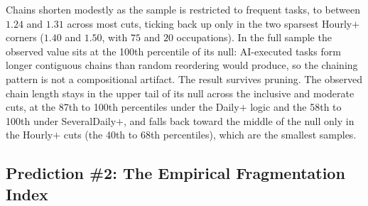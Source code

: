 Chains shorten modestly as the sample is restricted to frequent tasks, to between $1.24$ and $1.31$ across most cuts, ticking back up only in the two sparsest Hourly$+$ corners ($1.40$ and $1.50$, with $75$ and $20$ occupations).
In the full sample the observed value sits at the 100th percentile of its null: AI-executed tasks form longer contiguous chains than random reordering would produce, so the chaining pattern is not a compositional artifact.
The result survives pruning.
The observed chain length stays in the upper tail of its null across the inclusive and moderate cuts, at the 87th to 100th percentiles under the Daily$+$ logic and the 58th to 100th under SeveralDaily$+$, and falls back toward the middle of the null only in the Hourly$+$ cuts (the 40th to 68th percentiles), which are the smallest samples.



\subsection{Prediction \#2: The Empirical Fragmentation Index}
\label{app:frequency_robustness_frag}


